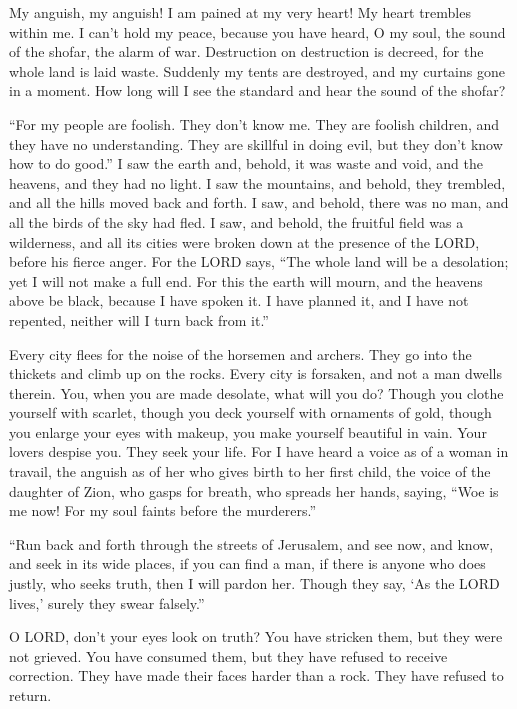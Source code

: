 \myverse{}My anguish, my anguish! I am pained at my very heart! My heart trembles within me. I can’t hold my peace, because you have heard, O my soul, the sound of the shofar, the alarm of war. \myverse{}Destruction on destruction is decreed, for the whole land is laid waste. Suddenly my tents are destroyed, and my curtains gone in a moment. \myverse{}How long will I see the standard and hear the sound of the shofar?


\myverse{}“For my people are foolish. They don’t know me. They are foolish children, and they have no understanding. They are skillful in doing evil, but they don’t know how to do good.” \myverse{}I saw the earth and, behold, it was waste and void, and the heavens, and they had no light. \myverse{}I saw the mountains, and behold, they trembled, and all the hills moved back and forth. \myverse{}I saw, and behold, there was no man, and all the birds of the sky had fled. \myverse{}I saw, and behold, the fruitful field was a wilderness, and all its cities were broken down at the presence of the LORD, before his fierce anger. \myverse{}For the LORD says, “The whole land will be a desolation; yet I will not make a full end. \myverse{}For this the earth will mourn, and the heavens above be black, because I have spoken it. I have planned it, and I have not repented, neither will I turn back from it.”


\myverse{}Every city flees for the noise of the horsemen and archers. They go into the thickets and climb up on the rocks. Every city is forsaken, and not a man dwells therein. \myverse{}You, when you are made desolate, what will you do? Though you clothe yourself with scarlet, though you deck yourself with ornaments of gold, though you enlarge your eyes with makeup, you make yourself beautiful in vain. Your lovers despise you. They seek your life. \myverse{}For I have heard a voice as of a woman in travail, the anguish as of her who gives birth to her first child, the voice of the daughter of Zion, who gasps for breath, who spreads her hands, saying, “Woe is me now! For my soul faints before the murderers.”


\mychapter{} \myverse*{}“Run back and forth through the streets of Jerusalem, and see now, and know, and seek in its wide places, if you can find a man, if there is anyone who does justly, who seeks truth, then I will pardon her. \myverse{}Though they say, ‘As the LORD lives,’ surely they swear falsely.”

\myverse{}O LORD, don’t your eyes look on truth? You have stricken them, but they were not grieved. You have consumed them, but they have refused to receive correction. They have made their faces harder than a rock. They have refused to return.


